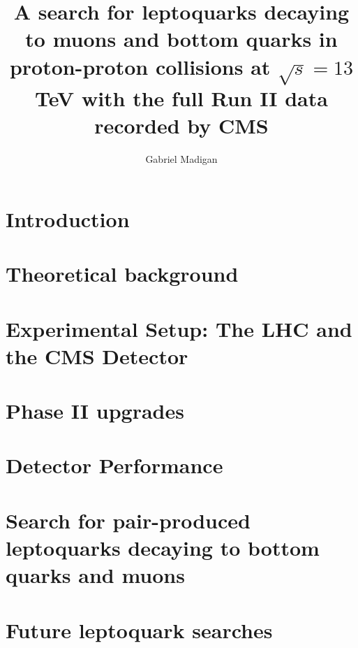 \documentclass[thesis]{neu}
\title{
A search for leptoquarks decaying to muons and bottom quarks in proton-proton collisions at $\sqrt{s}=13$ TeV with the full Run II data recorded by CMS 
}
\author{Gabriel Madigan}
\begin{document}
\newpage 

 


\chapter{Introduction} \label{chapter:Introduction}


\chapter{Theoretical background} \label{chapter:Theory}


\chapter{Experimental Setup: The LHC and the CMS Detector} \label{chapter:Experiment}


\chapter{Phase II upgrades} \label{chapter:Phase2Upgrades}


\chapter{Detector Performance} \label{chapter:DetectorPerformance}


\chapter{Search for pair-produced leptoquarks decaying to bottom quarks and muons} \label{chapter:LeptoquarkSearch}
   

\chapter{Future leptoquark searches} \label{chapter:FutureLQSearches}

\end{document}
